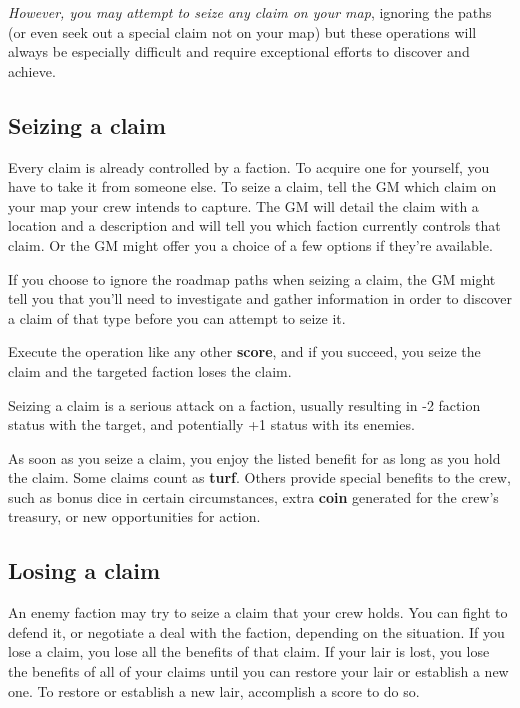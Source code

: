 \documentclass[11pt,fleqn,a5paper]{book}
\newcommand{\gameterm}[1]{\textbf{#1}}
\begin{document}
\emph{However, you may attempt to seize any claim on your map}, ignoring the paths (or even seek out a special claim not on your map) but these operations will always be especially difficult and require exceptional efforts to discover and achieve.

\subsection{Seizing a claim}

Every claim is already controlled by a faction. To acquire one for yourself, you have to take it from someone else. To seize a claim, tell the GM which claim on your map your crew intends to capture. The GM will detail the claim with a location and a description and will tell you which faction currently controls that claim. Or the GM might offer you a choice of a few options if they’re available.

If you choose to ignore the roadmap paths when seizing a claim, the GM might tell you that you’ll need to investigate and gather information in order to discover a claim of that type before you can attempt to seize it.

Execute the operation like any other \textbf{score}, and if you succeed, you seize the claim and the targeted faction loses the claim.

Seizing a claim is a serious attack on a faction, usually resulting in -2 faction status with the target, and potentially +1 status with its enemies.

As soon as you seize a claim, you enjoy the listed benefit for as long as you hold the claim. Some claims count as \textbf{turf}. Others provide special benefits to the crew, such as bonus dice in certain circumstances, extra \gameterm{coin}  generated for the crew’s treasury, or new opportunities for action.

\subsection{Losing a claim}

An enemy faction may try to seize a claim that your crew holds. You can fight to defend it, or negotiate a deal with the faction, depending on the situation. If you lose a claim, you lose all the benefits of that claim. If your lair is lost, you lose the benefits of all of your claims until you can restore your lair or establish a new one. To restore or establish a new lair, accomplish a score to do so.
\end{document}
